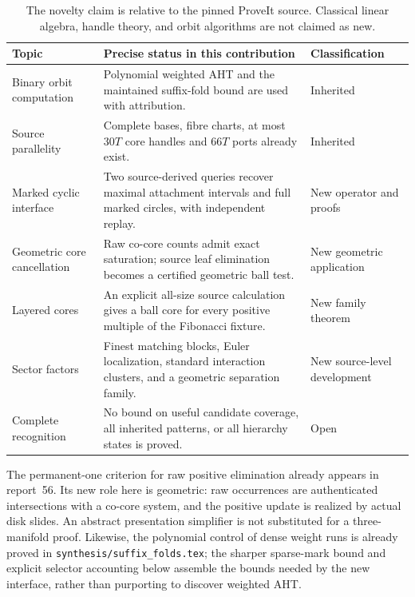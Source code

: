 \documentclass[11pt,a4paper]{article}
\theoremstyle{definition}
\newcommand{\code}[1]{\texttt{#1}}
\begin{document}
\begin{table}[htbp]
\centering\small
\begin{tabularx}{\textwidth}{@{}p{}Yp{.18\textwidth}@{}}
\toprule
Topic & Precise status in this contribution & Classification\\
\midrule
Binary orbit computation & Polynomial weighted AHT and the maintained
suffix-fold bound are used with attribution. & Inherited\\
Source parallelity & Complete bases, fibre charts, at most $30T$ core handles
and $66T$ ports already exist. & Inherited\\
Marked cyclic interface & Two source-derived queries recover maximal
attachment intervals and full marked circles, with independent replay. & New operator and proofs\\
Geometric core cancellation & Raw co-core counts admit exact saturation;
source leaf elimination becomes a certified geometric ball test. & New geometric application\\
Layered cores & An explicit all-size source calculation gives a ball core
for every positive multiple of the Fibonacci fixture. & New family theorem\\
Sector factors & Finest matching blocks, Euler localization, standard
interaction clusters, and a geometric separation family. & New source-level development\\
Complete recognition & No bound on useful candidate coverage, all inherited
patterns, or all hierarchy states is proved. & Open\\
\bottomrule
\end{tabularx}
\caption{The novelty claim is relative to the pinned ProveIt source.  Classical
linear algebra, handle theory, and orbit algorithms are not claimed as new.}
\label{main:status-table}
\end{table}

The permanent-one criterion for raw positive elimination already appears in
report~56.  Its new role here is geometric: raw occurrences are authenticated
intersections with a co-core system, and the positive update is realized by
actual disk slides.  An abstract presentation simplifier is not substituted
for a three-manifold proof.  Likewise, the polynomial control of dense weight
runs is already proved in \code{synthesis/suffix\_folds.tex}; the sharper
sparse-mark bound and explicit selector accounting below assemble the bounds
needed by the new interface, rather than purporting to discover weighted AHT.
\end{document}
